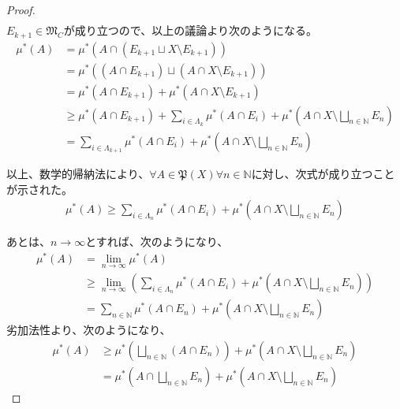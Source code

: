\documentclass[dvipdfmx]{jsarticle}
\begin{document}
\begin{proof}
\begin{align*}
\end{align*}
$E_{k + 1} \in \mathfrak{M}_{C}$が成り立つので、以上の議論より次のようになる。
\begin{align*}
\mu^{*}(A) &= \mu^{*}\left( A \cap \left( E_{k + 1} \sqcup X \setminus E_{k + 1} \right) \right)\\
&= \mu^{*}\left( \left( A \cap E_{k + 1} \right) \sqcup \left( A \cap X \setminus E_{k + 1} \right) \right)\\
&= \mu^{*}\left( A \cap E_{k + 1} \right) + \mu^{*}\left( A \cap X \setminus E_{k + 1} \right)\\
&\geq \mu^{*}\left( A \cap E_{k + 1} \right) + \sum_{i \in \varLambda_{k}} {\mu^{*}\left( A \cap E_{i} \right)} + \mu^{*}\left( A \cap X \setminus \bigsqcup_{n \in \mathbb{N}} E_{n} \right)\\
&= \sum_{i \in \varLambda_{k + 1}} {\mu^{*}\left( A \cap E_{i} \right)} + \mu^{*}\left( A \cap X \setminus \bigsqcup_{n \in \mathbb{N}} E_{n} \right)
\end{align*}\par
以上、数学的帰納法により、$\forall A \in \mathfrak{P}(X)\forall n \in \mathbb{N}$に対し、次式が成り立つことが示された。
\begin{align*}
\mu^{*}(A) \geq \sum_{i \in \varLambda_{n}} {\mu^{*}\left( A \cap E_{i} \right)} + \mu^{*}\left( A \cap X \setminus \bigsqcup_{n \in \mathbb{N}} E_{n} \right)
\end{align*}\par
あとは、$n \rightarrow \infty$とすれば、次のようになり、
\begin{align*}
\mu^{*}(A) &= \lim_{n \rightarrow \infty}{\mu^{*}(A)}\\
&\geq \lim_{n \rightarrow \infty}\left( \sum_{i \in \varLambda_{n}} {\mu^{*}\left( A \cap E_{i} \right)} + \mu^{*}\left( A \cap X \setminus \bigsqcup_{n \in \mathbb{N}} E_{n} \right) \right)\\
&= \sum_{n \in \mathbb{N}} {\mu^{*}\left( A \cap E_{n} \right)} + \mu^{*}\left( A \cap X \setminus \bigsqcup_{n \in \mathbb{N}} E_{n} \right)
\end{align*}
劣加法性より、次のようになり、
\begin{align*}
\mu^{*}(A) &\geq \mu^{*}\left( \bigsqcup_{n \in \mathbb{N}} \left( A \cap E_{n} \right) \right) + \mu^{*}\left( A \cap X \setminus \bigsqcup_{n \in \mathbb{N}} E_{n} \right)\\
&= \mu^{*}\left( A \cap \bigsqcup_{n \in \mathbb{N}} E_{n} \right) + \mu^{*}\left( A \cap X \setminus \bigsqcup_{n \in \mathbb{N}} E_{n} \right)

\end{align*}
\end{proof}
\end{document}

